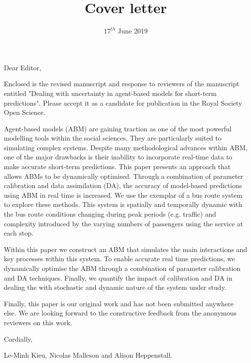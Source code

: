 \documentclass{article}
\title{Cover letter}
\date{$17^{th}$ June 2019}
\begin{document}
\maketitle

Dear Editor,

Enclosed is the revised manuscript and response to reviewers of the manuscript entitled "Dealing with uncertainty in
agent-based models for
short-term predictions". Please accept it as a candidate for publication in the Royal Society Open Science. 

Agent-based models (ABM) are gaining traction as one of the most powerful modelling tools within the social sciences.
They are particularly suited to simulating complex systems. Despite many methodological advances within ABM, one of the major drawbacks is their inability to 
incorporate real-time data to make accurate short-term predictions. This paper presents an approach that allows ABMs to be dynamically optimised. Through a combination of parameter calibration and data assimilation (DA), the accuracy of model-based predictions using ABM in real time is increased.  We use the exemplar of a bus route system to explore these methods.  This system is spatially and temporally dynamic with the bus route conditions changing during peak periods (e.g. traffic) and complexity introduced by the varying numbers of passengers using the service at each stop.

Within this paper we construct an ABM that simulates the main interactions and key processes within this system.  To enable accurate real time predictions, we dynamically optimise the ABM through a combination of parameter calibration and DA techniques.  Finally, we quantify the impact of calibration and DA in dealing
the with stochastic and dynamic nature of the system under study.

Finally, this paper is our original work and has not been submitted anywhere else. We are looking forward to the constructive feedback from the anonymous reviewers on this work. 

Cordially,

Le-Minh Kieu, Nicolas Malleson and Alison Heppenstall. 
\end{document}
